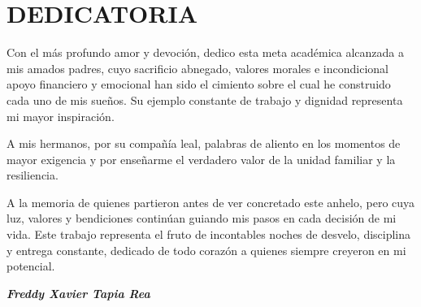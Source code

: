 
\pagestyle{empty}
\onehalfspacing
\fontsize{12}{18}\selectfont

\section*{DEDICATORIA}

\vspace{1.5cm}

Con el más profundo amor y devoción, dedico esta meta académica alcanzada a mis amados padres, cuyo sacrificio abnegado, valores morales e incondicional apoyo financiero y emocional han sido el cimiento sobre el cual he construido cada uno de mis sueños. Su ejemplo constante de trabajo y dignidad representa mi mayor inspiración.

A mis hermanos, por su compañía leal, palabras de aliento en los momentos de mayor exigencia y por enseñarme el verdadero valor de la unidad familiar y la resiliencia.

A la memoria de quienes partieron antes de ver concretado este anhelo, pero cuya luz, valores y bendiciones continúan guiando mis pasos en cada decisión de mi vida. Este trabajo representa el fruto de incontables noches de desvelo, disciplina y entrega constante, dedicado de todo corazón a quienes siempre creyeron en mi potencial.

\vspace{2.5cm}

\begin{flushright}
\itshape
\textbf{Freddy Xavier Tapia Rea}
\end{flushright}

\newpage
